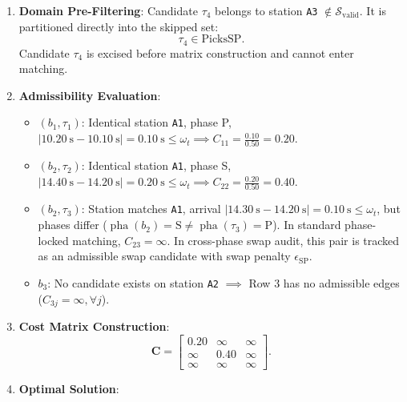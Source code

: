 \begin{enumerate}
  \item \textbf{Domain Pre-Filtering}: Candidate $\tau_4$ belongs to
    station \texttt{A3}
    $\notin \mathcal{S}_{\text{valid}}$. It is partitioned directly
    into the skipped set:
    \begin{equation}
      \tau_4 \in \mathrm{PicksSP}.
    \end{equation}
    Candidate $\tau_4$ is excised before matrix construction and
    cannot enter matching.
  \item \textbf{Admissibility Evaluation}:
    \begin{itemize}
      \item $(b_1, \tau_1)$: Identical station \texttt{A1}, phase P,
        $|\qty{10.20}{\second} - \qty{10.10}{\second}| =
        \qty{0.10}{\second} \le \omega_t \implies C_{11} =
        \frac{0.10}{0.50} = \num{0.20}$.
      \item $(b_2, \tau_2)$: Identical station \texttt{A1}, phase S,
        $|\qty{14.40}{\second} - \qty{14.20}{\second}| =
        \qty{0.20}{\second} \le \omega_t \implies C_{22} =
        \frac{0.20}{0.50} = \num{0.40}$.
      \item $(b_2, \tau_3)$: Station matches \texttt{A1}, arrival
        $|\qty{14.30}{\second} - \qty{14.20}{\second}| =
        \qty{0.10}{\second} \le \omega_t$, but phases differ
        ($\operatorname{pha}(b_2) = \mathrm{S} \ne
        \operatorname{pha}(\tau_3) = \mathrm{P}$). In standard
        phase-locked matching, $C_{23} = \infty$. In cross-phase
        swap audit, this pair is tracked as an admissible swap
        candidate with swap penalty $\epsilon_{\mathrm{SP}}$.
      \item $b_3$: No candidate exists on station \texttt{A2}
        $\implies$ Row 3 has no admissible edges ($C_{3j} = \infty,
        \forall j$).
    \end{itemize}
  \item \textbf{Cost Matrix Construction}:
    \begin{equation}
      \mathbf{C} =
      \begin{bmatrix}
        \num{0.20} & \infty & \infty \\
        \infty & \num{0.40} & \infty \\
        \infty & \infty & \infty
      \end{bmatrix}.
    \end{equation}
  \item \textbf{Optimal Solution}:
    \begin{align}

\end{align}
\end{enumerate}
